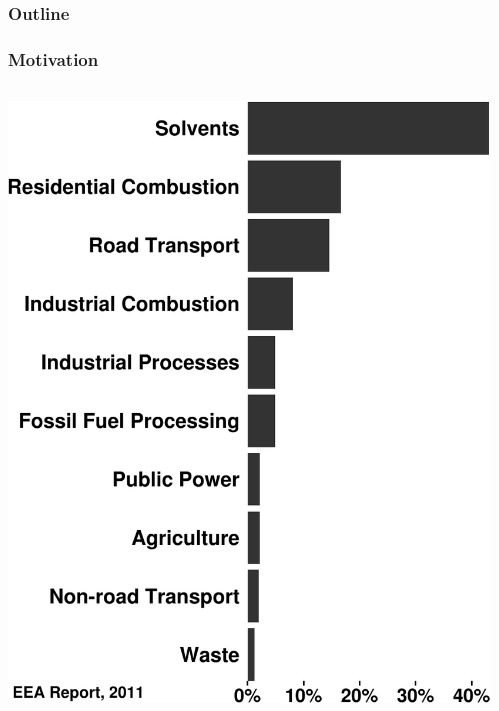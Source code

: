 \begin{frame}
    \frametitle{Outline} 
    \tableofcontents[currentsection]
\end{frame} 

\begin{frame}
    \frametitle{Motivation}
    \begin{columns}[onlytextwidth]
        \begin{column}{0.45\textwidth}
            \begin{flushleft}
                \vspace{-1.5cm}
                \includegraphics[width=1.10\textwidth]{../Pictures/Sector_conributions} 
            \end{flushleft}
        \end{column}%
        \begin{column}{0.45\textwidth}
            \begin{flushright}
                \vspace{-1.5cm}

\end{flushright}
\end{column}
\end{columns}
\end{frame}
